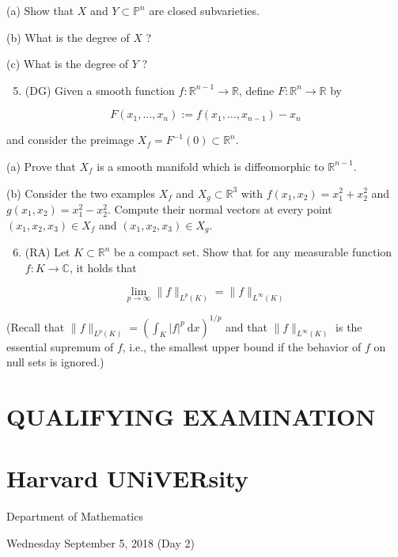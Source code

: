 \documentclass[10pt]{article}
\begin{document}
(a) Show that $X$ and $Y \subset \mathbb{P}^{n}$ are closed subvarieties.

(b) What is the degree of $X$ ?

(c) What is the degree of $Y$ ?

\begin{enumerate}
  \setcounter{enumi}{4}
  \item (DG) Given a smooth function $f: \mathbb{R}^{n-1} \rightarrow \mathbb{R}$, define $F: \mathbb{R}^{n} \rightarrow \mathbb{R}$ by
\end{enumerate}

$$
F\left(x_{1}, \ldots, x_{n}\right):=f\left(x_{1}, \ldots, x_{n-1}\right)-x_{n}
$$

and consider the preimage $X_{f}=F^{-1}(0) \subset \mathbb{R}^{n}$.

(a) Prove that $X_{f}$ is a smooth manifold which is diffeomorphic to $\mathbb{R}^{n-1}$.

(b) Consider the two examples $X_{f}$ and $X_{g} \subset \mathbb{R}^{3}$ with $f\left(x_{1}, x_{2}\right)=x_{1}^{2}+x_{2}^{2}$ and $g\left(x_{1}, x_{2}\right)=x_{1}^{2}-x_{2}^{2}$. Compute their normal vectors at every point $\left(x_{1}, x_{2}, x_{3}\right) \in X_{f}$ and $\left(x_{1}, x_{2}, x_{3}\right) \in X_{g}$.

\begin{enumerate}
  \setcounter{enumi}{5}
  \item (RA) Let $K \subset \mathbb{R}^{n}$ be a compact set. Show that for any measurable function $f: K \rightarrow \mathbb{C}$, it holds that
\end{enumerate}

$$
\lim _{p \rightarrow \infty}\|f\|_{L^{p}(K)}=\|f\|_{L^{\infty}(K)}
$$

(Recall that $\|f\|_{L^{p}(K)}=\left(\int_{K}|f|^{p} \mathrm{~d} x\right)^{1 / p}$ and that $\|f\|_{L^{\infty}(K)}$ is the essential supremum of $f$, i.e., the smallest upper bound if the behavior of $f$ on null sets is ignored.)

\section{QUALIFYING EXAMINATION}
\section{Harvard UNiVERsity}
Department of Mathematics

Wednesday September 5, 2018 (Day 2)
\end{document}
